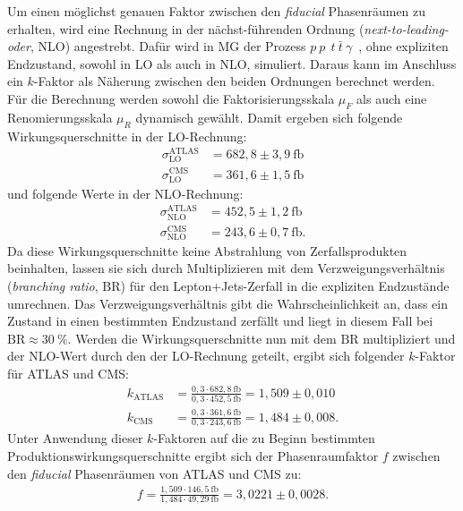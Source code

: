 Um einen möglichst genauen Faktor zwischen den \textit{fiducial} Phasenräumen zu erhalten, wird eine Rechnung in der nächst-führenden Ordnung (\textit{next-to-leading-oder}, NLO) angestrebt. Dafür wird in MG der Prozess $p~p~$\textrightarrow$~t~\bar{t}~\gamma$~, ohne expliziten Endzustand, sowohl in LO als auch in NLO, simuliert. Daraus kann im Anschluss ein $k$-Faktor als Näherung zwischen den beiden Ordnungen berechnet werden.\\
Für die Berechnung werden sowohl die Faktorisierungsskala $\mu_{F}$ als auch eine Renomierungsskala $\mu_{R}$ dynamisch gewählt.
Damit ergeben sich folgende Wirkungsquerschnitte in der LO-Rechnung:
\begin{align}
  \sigma^{\text{ATLAS}}_{\text{LO}} &= 682,8 \pm 3,9~ \si{\femto\barn}\\
  \sigma^{\text{CMS}}_{\text{LO}} &= 361,6 \pm 1,5~ \si{\femto\barn}
\end{align}
und folgende Werte in der NLO-Rechnung:
\begin{align}
  \sigma^{\text{ATLAS}}_{\text{NLO}} &= 452,5 \pm 1,2~ \si{\femto\barn}\\
  \sigma^{\text{CMS}}_{\text{NLO}} &= 243,6 \pm 0,7~ \si{\femto\barn}.
\end{align}
Da diese Wirkungsquerschnitte keine Abstrahlung von Zerfallsprodukten beinhalten, lassen sie sich durch Multiplizieren mit dem Verzweigungsverhältnis (\textit{branching ratio}, $\mathrm{BR}$) für den Lepton+Jets-Zerfall in die expliziten Endzustände umrechnen.
Das Verzweigungsverhältnis gibt die Wahrscheinlichkeit an, dass ein Zustand in einen bestimmten Endzustand zerfällt und liegt in diesem Fall bei $\mathrm{BR}\approx\SI{30}{\percent}$. Werden die Wirkungsquerschnitte nun mit dem $\mathrm{BR}$ multipliziert und der NLO-Wert durch den der LO-Rechnung geteilt, ergibt sich folgender $k$-Faktor für ATLAS und CMS:
\begin{align}
  k_{\text{ATLAS}} &= \frac{0,3 \cdot 682,8~ \si{\femto\barn}}{0,3 \cdot 452,5~ \si{\femto\barn}} = 1,509 \pm 0,010\\
  k_{\text{CMS}} &= \frac{0,3 \cdot 361,6~ \si{\femto\barn}}{0,3 \cdot 243,6~ \si{\femto\barn}} = 1,484 \pm 0,008.
\end{align}
Unter Anwendung dieser $k$-Faktoren auf die zu Beginn bestimmten Produktionswirkungsquerschnitte ergibt sich der Phasenraumfaktor $f$ zwischen den \textit{fiducial} Phasenräumen von ATLAS und CMS zu:
\begin{align}
  f = \frac{1,509 \cdot 146,5~ \si{\femto\barn}}{1,484 \cdot 49,29~ \si{\femto\barn}} = 3,0221 \pm 0,0028.
\end{align}
